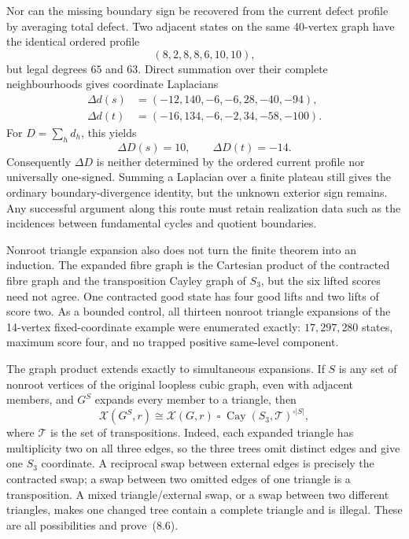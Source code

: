 \documentclass[11pt]{article}
\theoremstyle{definition}
\theoremstyle{remark}
\newcommand{\1}{\mathbf 1}
\begin{document}
Nor can the missing boundary sign be recovered from the current defect
profile by averaging total defect.  Two adjacent states on the same
40-vertex graph have the identical ordered profile
\[
                         (8,2,8,8,6,10,10),
\]
but legal degrees \(65\) and \(63\).  Direct summation over their complete
neighbourhoods gives coordinate Laplacians
\[
\begin{aligned}
\Delta d(s)&=(-12,140,-6,-6,28,-40,-94),\\
\Delta d(t)&=(-16,134,-6,-2,34,-58,-100).
\end{aligned}
\]
For \(D=\sum_h d_h\), this yields
\[
                         \Delta D(s)=10,\qquad\Delta D(t)=-14.
\]
Consequently \(\Delta D\) is neither determined by the ordered current
profile nor universally one-signed.  Summing a Laplacian over a finite
plateau still gives the ordinary boundary-divergence identity, but the
unknown exterior sign remains.  Any successful argument along this route
must retain realization data such as the incidences between fundamental
cycles and quotient boundaries.

Nonroot triangle expansion also does not turn the finite theorem into an
induction.  The expanded fibre graph is the Cartesian product of the
contracted fibre graph and the transposition Cayley graph of \(S_3\), but
the six lifted scores need not agree.  One contracted good state has four
good lifts and two lifts of score two.  As a bounded control, all thirteen
nonroot triangle expansions of the 14-vertex fixed-coordinate example were
enumerated exactly: \(17{,}297{,}280\) states, maximum score four, and no
trapped positive same-level component.

The graph product extends exactly to simultaneous expansions.  If \(S\)
is any set of nonroot vertices of the original loopless cubic graph, even
with adjacent members, and \(G^S\) expands every member to a triangle, then
\[
\mathcal X(G^S,r)\cong
\mathcal X(G,r)\mathbin{\square}
\operatorname{Cay}(S_3,\mathcal T)^{\square |S|},       \tag{8.6}
\]
where \(\mathcal T\) is the set of transpositions.  Indeed, each expanded
triangle has multiplicity two on all three edges, so the three trees omit
distinct edges and give one \(S_3\) coordinate.  A reciprocal swap between
external edges is precisely the contracted swap; a swap between two
omitted edges of one triangle is a transposition.  A mixed
triangle/external swap, or a swap between two different triangles, makes
one changed tree contain a complete triangle and is illegal.  These are all
possibilities and prove~(8.6).
\end{document}
